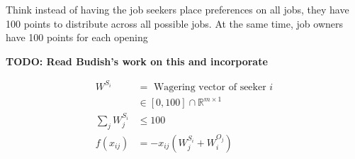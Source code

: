 Think instead of having the job seekers place preferences on all jobs, they have 100 points to distribute across all possible jobs. At the same time, job owners have 100 points for each opening

\textbf{TODO: Read Budish's work on this and incorporate}

\begin{align}
W^{S_i} &= \text{ Wagering vector of seeker $i$} \\
& \in [0,100] \cap \mathbb{R}^{m \times 1} \\
\sum_j W^{S_i}_{j} &\leq 100 \\
f(x_{ij})&= -x_{ij}(W^{S_i}_j + W^{O_j}_i)
\end{align}